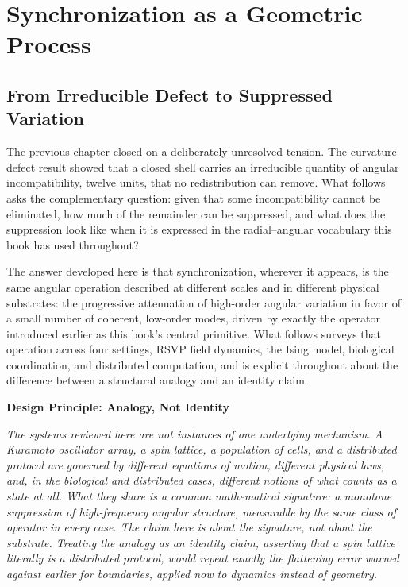 \documentclass[11pt,fleqn]{book}
\numberwithin{equation}{chapter}
\newenvironment{principle}[1]
  {\begin{principleEnv}
   \noindent\textbf{Design Principle: #1}\par\smallskip\itshape}
  {\end{principleEnv}}
\theoremstyle{plain}
\theoremstyle{definition}
\theoremstyle{remark}
\begin{document}

\chapter{Synchronization as a Geometric Process}

\section{From Irreducible Defect to Suppressed Variation}

The previous chapter closed on a deliberately unresolved tension. The curvature-defect result showed that a closed shell carries an irreducible quantity of angular incompatibility, twelve units, that no redistribution can remove. What follows asks the complementary question: given that some incompatibility cannot be eliminated, how much of the remainder can be suppressed, and what does the suppression look like when it is expressed in the radial--angular vocabulary this book has used throughout?

The answer developed here is that synchronization, wherever it appears, is the same angular operation described at different scales and in different physical substrates: the progressive attenuation of high-order angular variation in favor of a small number of coherent, low-order modes, driven by exactly the operator introduced earlier as this book's central primitive. What follows surveys that operation across four settings, RSVP field dynamics, the Ising model, biological coordination, and distributed computation, and is explicit throughout about the difference between a structural analogy and an identity claim.

\begin{principle}{Analogy, Not Identity}
The systems reviewed here are not instances of one underlying mechanism. A Kuramoto oscillator array, a spin lattice, a population of cells, and a distributed protocol are governed by different equations of motion, different physical laws, and, in the biological and distributed cases, different notions of what counts as a state at all. What they share is a common mathematical signature: a monotone suppression of high-frequency angular structure, measurable by the same class of operator in every case. The claim here is about the signature, not about the substrate. Treating the analogy as an identity claim, asserting that a spin lattice literally is a distributed protocol, would repeat exactly the flattening error warned against earlier for boundaries, applied now to dynamics instead of geometry.
\end{principle}
\end{document}

